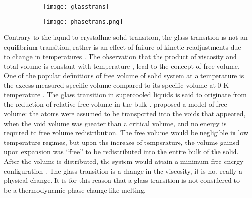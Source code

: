 \begin{figure}[!h] \centering
	\begin{subfigure}{0.4\textwidth} \vfill
		\texttt{[image: glasstrans]}
		\subcaption{}
	\end{subfigure}%
	\begin{subfigure}{0.6\textwidth}
		\texttt{[image: phasetrans.png]}
		\subcaption{}
	\end{subfigure}
	\label{f:rq-mg-sch}
\end{figure}

Contrary to the liquid-to-crystalline solid transition, the glass transition is not an equilibrium transition, rather is an effect of failure of kinetic readjustments due to change in temperatures \cite{Fox1950,Ramachandrarao1977,Ediger1996}. The observation that the product of viscosity and total volume is constant with temperature \cite{Batschinski1913}, lead to the concept of free volume. One of the popular definitions of free volume of solid system at a temperature is the excess measured specific volume compared to its specific volume at 0 K temperature \cite{Ramachandrarao1977}. The glass transition in supercooled liquids is said to originate from the reduction of relative free volume in the bulk \cite{Fox1951}. \textcite{Cohen1959} proposed a model of free volume: the atoms were assumed to be transported into the voids that appeared, when the void volume was greater than a critical volume, and no energy is required to free volume redistribution. The free volume would be negligible in low temperature regimes, but upon the increase of temperature, the volume gained upon expansion was ``free'' to be redistributed into the entire bulk of the solid. After the volume is distributed, the system would attain a minimum free energy configuration \cite{Turnbull1961}. The glass transition is a change in the viscosity, it is not really a physical change. It is for this reason that a glass transition is not considered to be a thermodynamic phase change like melting. \par


